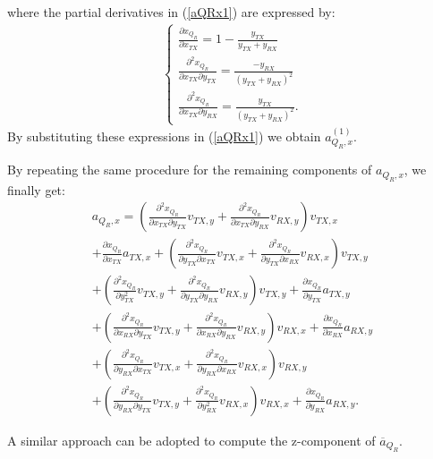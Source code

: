 	where the partial derivatives in (\ref{aQRx1}) are expressed by:
	\begin{equation*}
	\begin{gathered}
	\begin{cases*}
	\frac{\partial x_{Q_R}}{\partial x_{TX}} = 1 - \frac{y_{TX}}{y_{TX}+y_{RX}}\\ 
	\frac{\partial^2 x_{Q_R}}{\partial x_{TX} \partial y_{TX}} = \frac{-y_{RX}}{\left( y_{TX}+y_{RX}\right)^2}\\ 
	\frac{\partial^2 x_{Q_R}}{\partial x_{TX} \partial y_{RX}} = \frac{y_{TX}}{\left( y_{TX}+y_{RX}\right)^2}.
	\end{cases*}
	\end{gathered}
	\end{equation*}
	By substituting these expressions in (\ref{aQRx1}) we obtain $a_{Q_R,x}^{(1)}$. \par
	By repeating the same procedure for the remaining components of $a_{Q_R,x}$, we finally get: 
	\begin{equation}
			\begin{gathered}
			a_{Q_R,x} = \left(\frac{\partial^2 x_{Q_R}}{\partial x_{TX} \partial y_{TX}} v_{TX,y}  + \frac{\partial^2 x_{Q_R}}{\partial x_{TX} \partial y_{RX}} v_{RX,y} \right) v_{TX,x}  \\
			+\frac{\partial x_{Q_R}}{\partial x_{TX}} a_{TX,x} + \left(\frac{\partial^2 x_{Q_R}}{\partial y_{TX} \partial x_{TX}} v_{TX,x} + \frac{\partial^2 x_{Q_R}}{\partial y_{TX} \partial x_{RX}} v_{RX,x} \right) v_{TX,y} \\ 
			+ \left (\frac{\partial^2 x_{Q_R}}{\partial y_{TX}^2 } v_{TX,y} + \frac{\partial^2 x_{Q_R}}{\partial y_{TX} \partial y_{RX} } v_{RX,y}  \right) v_{TX,y} + \frac{\partial x_{Q_R}}{\partial y_{TX}} a_{TX,y} \\ 
			+ \left(\frac{\partial^2 x_{Q_R}}{\partial x_{RX} \partial y_{TX}} v_{TX,y} + \frac{\partial^2 x_{Q_R}}{\partial x_{RX} \partial y_{RX}} v_{RX,y} \right) v_{RX,x} + \frac{\partial x_{Q_R}}{\partial x_{RX}} a_{RX,y} \\ 
			+ \left( \frac{\partial^2 x_{Q_R}}{\partial y_{RX} \partial x_{TX}} v_{TX,x} +  \frac{\partial^2 x_{Q_R}}{\partial y_{RX} \partial x_{RX}} v_{RX,x}  \right) v_{RX,y} \\ 
			+ \left(  \frac{\partial^2 x_{Q_R}}{\partial y_{RX} \partial y_{TX}} v_{TX,y} +  \frac{\partial^2 x_{Q_R}}{\partial y_{RX}^2} v_{RX,x}\right) v_{RX,x} + \frac{\partial x_{Q_R}}{\partial y_{RX}} a_{RX,y}.
			\end{gathered}
    \end{equation}
	
	A similar approach can be adopted to compute the z-component of  $\overline{a}_{Q_{R}}$.
